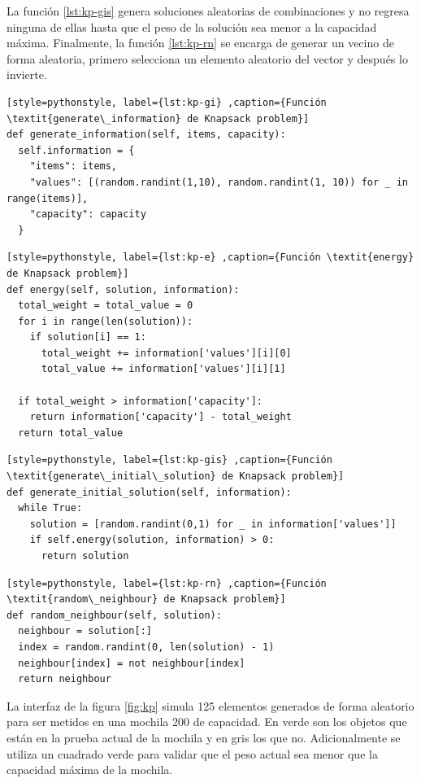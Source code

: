 \documentclass[12pt,twoside]{article}
\begin{document}
	La función \ref{lst:kp-gis} genera soluciones aleatorias de combinaciones y no regresa ninguna de ellas hasta que el peso de la solución sea menor a la capacidad máxima. Finalmente, la función \ref{lst:kp-rn} se encarga de generar un vecino de forma aleatoria, primero selecciona un elemento aleatorio del vector y después lo invierte.  
	
\begin{lstlisting}[style=pythonstyle, label={lst:kp-gi} ,caption={Función \textit{generate\_information} de Knapsack problem}]
def generate_information(self, items, capacity):
  self.information = {
  	"items": items,
  	"values": [(random.randint(1,10), random.randint(1, 10)) for _ in range(items)],
  	"capacity": capacity
  }
\end{lstlisting}

\begin{lstlisting}[style=pythonstyle, label={lst:kp-e} ,caption={Función \textit{energy} de Knapsack problem}]
def energy(self, solution, information):
  total_weight = total_value = 0
  for i in range(len(solution)):
	if solution[i] == 1:
	  total_weight += information['values'][i][0]
	  total_value += information['values'][i][1]

  if total_weight > information['capacity']:
	return information['capacity'] - total_weight
  return total_value
\end{lstlisting}

\begin{lstlisting}[style=pythonstyle, label={lst:kp-gis} ,caption={Función \textit{generate\_initial\_solution} de Knapsack problem}]
def generate_initial_solution(self, information):
  while True:
 	solution = [random.randint(0,1) for _ in information['values']]
	if self.energy(solution, information) > 0:
	  return solution
\end{lstlisting}


\begin{lstlisting}[style=pythonstyle, label={lst:kp-rn} ,caption={Función \textit{random\_neighbour} de Knapsack problem}]
def random_neighbour(self, solution):
  neighbour = solution[:]
  index = random.randint(0, len(solution) - 1)
  neighbour[index] = not neighbour[index]
  return neighbour     
\end{lstlisting}
	
	La interfaz de la figura \ref{fig:kp} simula 125 elementos generados de forma aleatorio para ser metidos en una mochila 200 de capacidad. En verde son los objetos que están en la prueba actual de la mochila y en gris los que no. Adicionalmente se utiliza un cuadrado verde para validar que el peso actual sea menor que la capacidad máxima de la mochila.
	
\end{document}
